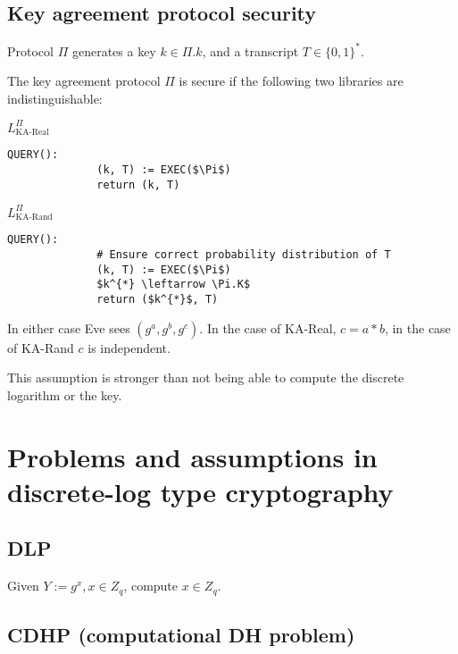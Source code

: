 \documentclass[a4paper]{scrreprt}
\begin{document}
\section{Key agreement protocol security}

Protocol $\Pi$ generates a key $k \in \Pi.k$, and a transcript $T \in \{0,
1\}^{*}$.

The key agreement protocol $\Pi$ is secure if the following two libraries are
indistinguishable:


\begin{tcbraster}[raster columns=2,raster equal height,nobeforeafter,raster column skip=2cm]
	\begin{library}{$L^\Pi_{\text{KA-Real}}$}
		\begin{lstlisting}[mathescape=true,autogobble=true]
			QUERY():
			  (k, T) := EXEC($\Pi$)
			  return (k, T)
		\end{lstlisting}
	\end{library}
	\begin{library}{$L^\Pi_{\text{KA-Rand}}$}
		\begin{lstlisting}[mathescape=true,autogobble=true]
			QUERY():
			  # Ensure correct probability distribution of T
			  (k, T) := EXEC($\Pi$)
			  $k^{*} \leftarrow \Pi.K$
			  return ($k^{*}$, T)
		\end{lstlisting}
	\end{library}
\end{tcbraster}

In either case Eve sees $(g^a, g^b, g^c)$. In the case of KA-Real, $c = a*b$,
in the case of KA-Rand $c$ is independent.

This assumption is stronger than not being able to compute the discrete
logarithm or the key.

\chapter{Problems and assumptions in discrete-log type cryptography}

\section{DLP}

Given $Y := g^x, x \in Z_q$, compute $x \in Z_q$.

\section{CDHP (computational DH problem)}
\end{document}
